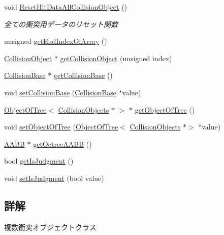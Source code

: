 \begin{DoxyCompactItemize}
void \mbox{\hyperlink{class_collision_objects_a01ffe9567540a819f19cd66f96981b47}{Reset\+Hit\+Data\+All\+Collision\+Object}} ()
\begin{DoxyCompactList}\small\item\em 全ての衝突用データのリセット関数 \end{DoxyCompactList}\item 
unsigned \mbox{\hyperlink{class_collision_objects_a309eef4695b4a19f389eaf5d0753c256}{get\+End\+Index\+Of\+Array}} ()
\item 
\mbox{\hyperlink{class_collision_object}{Collision\+Object}} $\ast$ \mbox{\hyperlink{class_collision_objects_a4f5c029b20a7ed4c7fdee815f73d20be}{get\+Collision\+Object}} (unsigned index)
\item 
\mbox{\hyperlink{class_collision_base}{Collision\+Base}} $\ast$ \mbox{\hyperlink{class_collision_objects_af95769194fff92babcf411c2262c9d10}{get\+Collision\+Base}} ()
\item 
void \mbox{\hyperlink{class_collision_objects_a144f0c9160c0dda1579c26a0726fdbb6}{set\+Collision\+Base}} (\mbox{\hyperlink{class_collision_base}{Collision\+Base}} $\ast$value)
\item 
\mbox{\hyperlink{class_object_of_tree}{Object\+Of\+Tree}}$<$ \mbox{\hyperlink{class_collision_objects}{Collision\+Objects}} $\ast$ $>$ $\ast$ \mbox{\hyperlink{class_collision_objects_a344311b0c469e591a112eb1d6b0247cb}{get\+Object\+Of\+Tree}} ()
\item 
void \mbox{\hyperlink{class_collision_objects_a3d5a69741d66dcdebfae5a54a15c4b88}{set\+Object\+Of\+Tree}} (\mbox{\hyperlink{class_object_of_tree}{Object\+Of\+Tree}}$<$ \mbox{\hyperlink{class_collision_objects}{Collision\+Objects}} $\ast$$>$ $\ast$value)
\item 
\mbox{\hyperlink{class_a_a_b_b}{A\+A\+BB}} $\ast$ \mbox{\hyperlink{class_collision_objects_aee138e1c28f7f3dcbdce56181d59b628}{get\+Octree\+A\+A\+BB}} ()
\item 
bool \mbox{\hyperlink{class_collision_objects_a1320a57aae5798c04e65b2b7c8433aae}{get\+Is\+Judgment}} ()
\item 
void \mbox{\hyperlink{class_collision_objects_a61e67c1c0ea20a01d9e4a5b2d1b45428}{set\+Is\+Judgment}} (bool value)
\end{DoxyCompactItemize}


\subsection{詳解}
複数衝突オブジェクトクラス 

